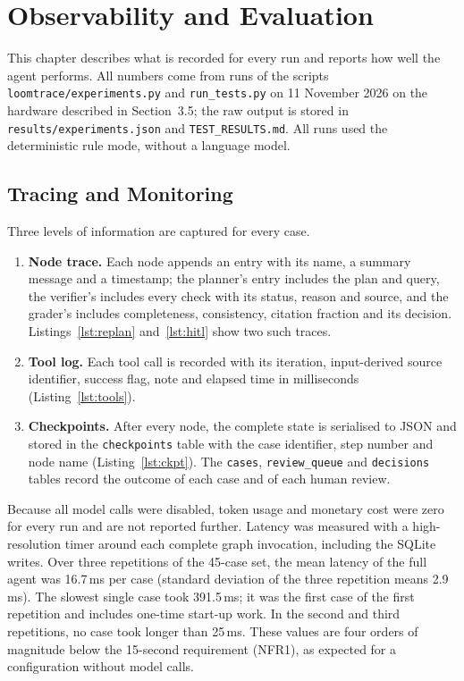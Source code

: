 \chapter{Observability and Evaluation}

This chapter describes what is recorded for every run and reports how well the agent performs. All
numbers come from runs of the scripts \texttt{loomtrace/experiments.py} and \texttt{run\_tests.py} on
11 November 2026 on the hardware described in Section~3.5; the raw output is stored in
\texttt{results/experiments.json} and \texttt{TEST\_RESULTS.md}. All runs used the deterministic rule
mode, without a language model.

\section{Tracing and Monitoring}

Three levels of information are captured for every case.

\begin{enumerate}[itemsep=2pt]
\item \textbf{Node trace.} Each node appends an entry with its name, a summary message and a
timestamp; the planner's entry includes the plan and query, the verifier's includes every check with
its status, reason and source, and the grader's includes completeness, consistency, citation fraction
and its decision. Listings~\ref{lst:replan} and~\ref{lst:hitl} show two such traces.
\item \textbf{Tool log.} Each tool call is recorded with its iteration, input-derived source
identifier, success flag, note and elapsed time in milliseconds (Listing~\ref{lst:tools}).
\item \textbf{Checkpoints.} After every node, the complete state is serialised to JSON and stored in the
\texttt{checkpoints} table with the case identifier, step number and node name
(Listing~\ref{lst:ckpt}). The \texttt{cases}, \texttt{review\_queue} and \texttt{decisions} tables
record the outcome of each case and of each human review.
\end{enumerate}

Because all model calls were disabled, token usage and monetary cost were zero for every run and are
not reported further. Latency was measured with a high-resolution timer around each complete graph
invocation, including the SQLite writes. Over three repetitions of the 45-case set, the mean latency
of the full agent was 16.7\,ms per case (standard deviation of the three repetition means 2.9\,ms).
The slowest single case took 391.5\,ms; it was the first case of the first repetition and includes
one-time start-up work. In the second and third repetitions, no case took longer than 25\,ms. These values are four
orders of magnitude below the 15-second requirement (NFR1), as expected for a configuration without
model calls.

